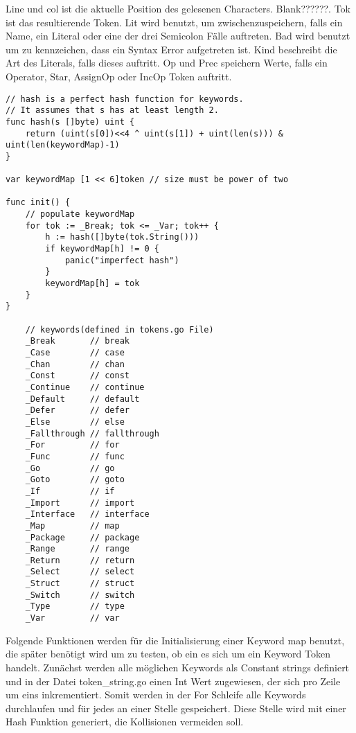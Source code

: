 Line und col ist die aktuelle Position des gelesenen Characters. Blank??????. Tok ist das resultierende Token. Lit wird benutzt, um zwischenzuspeichern, falls ein Name, ein Literal oder eine der drei Semicolon Fälle auftreten. Bad wird benutzt um zu kennzeichen, dass ein Syntax Error aufgetreten ist. Kind beschreibt die Art des Literals, falls dieses auftritt. Op und Prec speichern Werte, falls ein Operator, Star, AssignOp oder IncOp Token auftritt.

\begin{lstlisting}
// hash is a perfect hash function for keywords.
// It assumes that s has at least length 2.
func hash(s []byte) uint {
	return (uint(s[0])<<4 ^ uint(s[1]) + uint(len(s))) & uint(len(keywordMap)-1)
}

var keywordMap [1 << 6]token // size must be power of two

func init() {
	// populate keywordMap
	for tok := _Break; tok <= _Var; tok++ {
		h := hash([]byte(tok.String()))
		if keywordMap[h] != 0 {
			panic("imperfect hash")
		}
		keywordMap[h] = tok
	}
}

	// keywords(defined in tokens.go File)
	_Break       // break
	_Case        // case
	_Chan        // chan
	_Const       // const
	_Continue    // continue
	_Default     // default
	_Defer       // defer
	_Else        // else
	_Fallthrough // fallthrough
	_For         // for
	_Func        // func
	_Go          // go
	_Goto        // goto
	_If          // if
	_Import      // import
	_Interface   // interface
	_Map         // map
	_Package     // package
	_Range       // range
	_Return      // return
	_Select      // select
	_Struct      // struct
	_Switch      // switch
	_Type        // type
	_Var         // var
\end{lstlisting}
Folgende Funktionen werden für die Initialisierung einer Keyword map benutzt, die später benötigt wird um zu testen, ob ein es sich um ein Keyword Token handelt. Zunächst werden alle möglichen Keywords als Constant strings definiert und in der Datei token\_string.go einen Int Wert zugewiesen, der sich pro Zeile um eins inkrementiert. Somit werden in der For Schleife alle Keywords durchlaufen und für jedes an einer Stelle gespeichert. Diese Stelle wird mit einer Hash Funktion generiert, die Kollisionen vermeiden soll.

